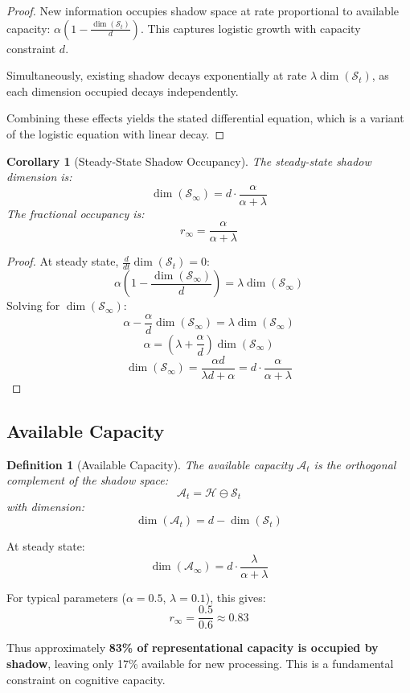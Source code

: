 \documentclass[reprint, amsmath, amssymb, aps, prd]{revtex4-2}
\newtheorem{definition}{Definition}[section]
\newtheorem{corollary}{Corollary}[section]
\begin{document}
\begin{proof}
New information occupies shadow space at rate proportional to available capacity: $\alpha(1 - \frac{\dim(\mathcal{S}_t)}{d})$. This captures logistic growth with capacity constraint $d$.

Simultaneously, existing shadow decays exponentially at rate $\lambda \dim(\mathcal{S}_t)$, as each dimension occupied decays independently.

Combining these effects yields the stated differential equation, which is a variant of the logistic equation with linear decay.
\end{proof}

\begin{corollary}[Steady-State Shadow Occupancy]
The steady-state shadow dimension is:
\[
\dim(\mathcal{S}_\infty) = d \cdot \frac{\alpha}{\alpha + \lambda}
\]
The fractional occupancy is:
\[
r_\infty = \frac{\alpha}{\alpha + \lambda}
\]
\end{corollary}

\begin{proof}
At steady state, $\frac{d}{dt}\dim(\mathcal{S}_t) = 0$:
\[
\alpha\left(1 - \frac{\dim(\mathcal{S}_\infty)}{d}\right) = \lambda \dim(\mathcal{S}_\infty)
\]
Solving for $\dim(\mathcal{S}_\infty)$:
\[
\alpha - \frac{\alpha}{d}\dim(\mathcal{S}_\infty) = \lambda \dim(\mathcal{S}_\infty)
\]
\[
\alpha = \left(\lambda + \frac{\alpha}{d}\right)\dim(\mathcal{S}_\infty)
\]
\[
\dim(\mathcal{S}_\infty) = \frac{\alpha d}{\lambda d + \alpha} = d \cdot \frac{\alpha}{\alpha + \lambda}
\]
\end{proof}

\subsection{Available Capacity}

\begin{definition}[Available Capacity]
The available capacity $\mathcal{A}_t$ is the orthogonal complement of the shadow space:
\[
\mathcal{A}_t = \mathcal{H} \ominus \mathcal{S}_t
\]
with dimension:
\[
\dim(\mathcal{A}_t) = d - \dim(\mathcal{S}_t)
\]
\end{definition}

At steady state:
\[
\dim(\mathcal{A}_\infty) = d \cdot \frac{\lambda}{\alpha + \lambda}
\]

For typical parameters ($\alpha = 0.5$, $\lambda = 0.1$), this gives:
\[
r_\infty = \frac{0.5}{0.6} \approx 0.83
\]

Thus approximately \textbf{83\% of representational capacity is occupied by shadow}, leaving only 17\% available for new processing. This is a fundamental constraint on cognitive capacity.
\end{document}
